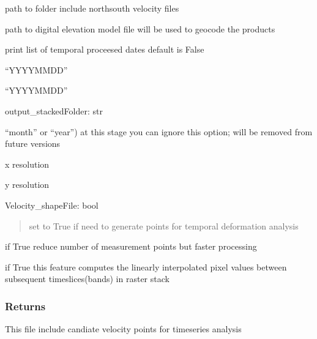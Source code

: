\documentclass[letterpaper,10pt]{sphinxmanual}
\begin{document}
\begin{fulllineitems}
\begin{description}
\sphinxAtStartPar
path to folder include north\sphinxhyphen{}south velocity files

\sphinxAtStartPar
path to digital elevation model file will be used to geocode the products

\sphinxAtStartPar
print list of temporal proceesed dates default is False

\sphinxAtStartPar
“YYYYMMDD”

\sphinxAtStartPar
“YYYYMMDD”

\end{description}

\sphinxAtStartPar
output\_stackedFolder: str
\begin{description}
\sphinxAtStartPar
“month” or “year”) at this stage you can ignore this option; will be removed from future versions

\sphinxAtStartPar
x resolution

\sphinxAtStartPar
y resolution

\end{description}

\sphinxAtStartPar
Velocity\_shapeFile: bool
\begin{quote}

\sphinxAtStartPar
set to True if need to generate points for temporal deformation analysis
\end{quote}
\begin{description}
\sphinxAtStartPar
if True reduce number of measurement points but faster processing

\sphinxAtStartPar
if True this feature computes the linearly interpolated pixel values between subsequent time\sphinxhyphen{}slices(bands) in raster stack

\end{description}


\subsubsection{Returns}
\label{\detokenize{generated/akhdefo_functions.stackprep:returns}}\begin{description}
\sphinxAtStartPar
This file include candiate velocity points for timeseries analysis

\end{description}

\end{fulllineitems}
\end{document}
